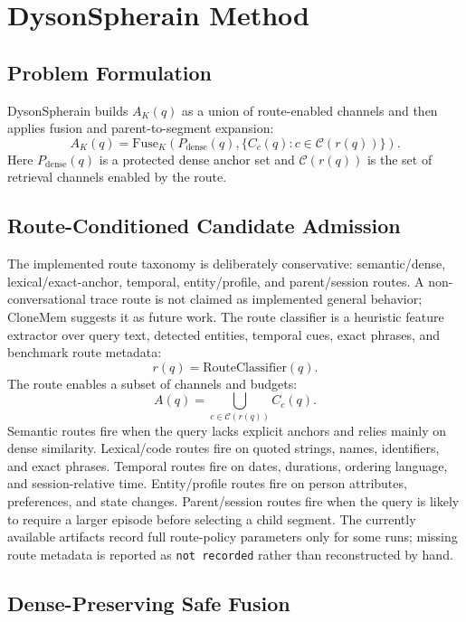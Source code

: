 \documentclass[10pt]{article}
\newcommand{\system}{DysonSpherain}
\begin{document}
\section{DysonSpherain Method}

\subsection{Problem Formulation}

\system{} builds $A_K(q)$ as a union of route-enabled channels and then applies
fusion and parent-to-segment expansion:
\[
A_K(q)=\mathrm{Fuse}_K\left(P_{\mathrm{dense}}(q),\{C_c(q): c\in
\mathcal{C}(r(q))\}\right).
\]
Here $P_{\mathrm{dense}}(q)$ is a protected dense anchor set and
$\mathcal{C}(r(q))$ is the set of retrieval channels enabled by the route.

\subsection{Route-Conditioned Candidate Admission}

The implemented route taxonomy is deliberately conservative: semantic/dense,
lexical/exact-anchor, temporal, entity/profile, and parent/session routes. A
non-conversational trace route is not claimed as implemented general behavior;
CloneMem suggests it as future work. The route classifier is a heuristic
feature extractor over query text, detected entities, temporal cues, exact
phrases, and benchmark route metadata:
\[
r(q)=\mathrm{RouteClassifier}(q).
\]
The route enables a subset of channels and budgets:
\[
A(q)=\bigcup_{c\in\mathcal{C}(r(q))}C_c(q).
\]
Semantic routes fire when the query lacks explicit anchors and relies mainly
on dense similarity. Lexical/code routes fire on quoted strings, names,
identifiers, and exact phrases. Temporal routes fire on dates, durations,
ordering language, and session-relative time. Entity/profile routes fire on
person attributes, preferences, and state changes. Parent/session routes fire
when the query is likely to require a larger episode before selecting a child
segment. The currently available artifacts record full route-policy parameters
only for some runs; missing route metadata is reported as \texttt{not recorded}
rather than reconstructed by hand.

\subsection{Dense-Preserving Safe Fusion}
\end{document}
